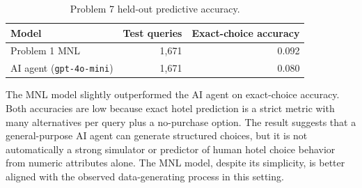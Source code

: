 \documentclass[11pt]{article}
\begin{document}
\begin{table}[H]
\centering
\caption{Problem 7 held-out predictive accuracy.}
\begin{tabular}{lrr}
\toprule
Model & Test queries & Exact-choice accuracy \\
\midrule
Problem 1 MNL & 1,671 & 0.092 \\
AI agent (\texttt{gpt-4o-mini}) & 1,671 & 0.080 \\
\bottomrule
\end{tabular}
\end{table}

The MNL model slightly outperformed the AI agent on exact-choice accuracy. Both accuracies are low because exact hotel prediction is a strict metric with many alternatives per query plus a no-purchase option. The result suggests that a general-purpose AI agent can generate structured choices, but it is not automatically a strong simulator or predictor of human hotel choice behavior from numeric attributes alone. The MNL model, despite its simplicity, is better aligned with the observed data-generating process in this setting.
\end{document}
